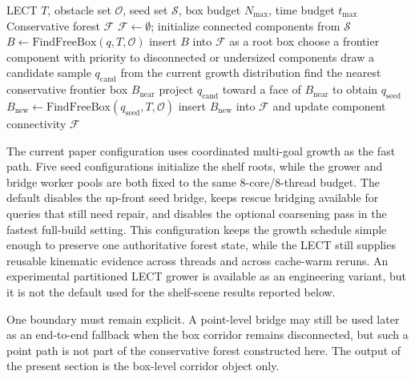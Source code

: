 \documentclass[journal]{IEEEtran}
\DeclareRobustCommand{\textsc}[1]{\textnormal{\MakeUppercase{#1}}}
\newcommand{\calO}{\ensuremath{\mathcal{O}}}
\begin{document}
\begin{algorithm}[t]
\caption{\textsc{GrowForest}---face-adjacent frontier expansion seeded by $\mathcal{S}$}
\label{alg:forest_growth}
\footnotesize
\begin{algorithmic}[1]
\REQUIRE LECT $T$, obstacle set $\calO$, seed set $\mathcal{S}$, box budget $N_{\max}$, time budget $t_{\max}$
\ENSURE Conservative forest $\mathcal{F}$
\STATE $\mathcal{F} \gets \emptyset$; initialize connected components from $\mathcal{S}$
  \STATE $B \gets \text{FindFreeBox}(q, T, \calO)$
    \STATE insert $B$ into $\mathcal{F}$ as a root box
  \ENDIF
\ENDFOR
{}
  \STATE choose a frontier component with priority to disconnected or undersized components
  \STATE draw a candidate sample $q_{\mathrm{cand}}$ from the current growth distribution
  \STATE find the nearest conservative frontier box $B_{\mathrm{near}}$
  \STATE project $q_{\mathrm{cand}}$ toward a face of $B_{\mathrm{near}}$ to obtain $q_{\mathrm{seed}}$
  \STATE $B_{\mathrm{new}} \gets \text{FindFreeBox}(q_{\mathrm{seed}}, T, \calO)$
    \STATE insert $B_{\mathrm{new}}$ into $\mathcal{F}$ and update component connectivity
  \ENDIF
\ENDWHILE
\STATE \RETURN $\mathcal{F}$
\end{algorithmic}
\end{algorithm}

The current paper configuration uses coordinated multi-goal growth as the fast
path. Five seed configurations initialize the shelf roots, while the grower and
bridge worker pools are both fixed to the same 8-core/8-thread budget. The
default disables the up-front seed bridge, keeps rescue bridging available for
queries that still need repair, and disables the optional coarsening pass in the
fastest full-build setting. This configuration keeps the growth schedule simple
enough to preserve one authoritative forest state, while the LECT still supplies
reusable kinematic evidence across threads and across cache-warm reruns. An
experimental partitioned LECT grower is available as an engineering variant, but
it is not the default used for the shelf-scene results reported below.

One boundary must remain explicit. A point-level bridge may still be used later
as an end-to-end fallback when the box corridor remains disconnected,
but such a point path is not part of the conservative forest constructed here. The
output of the present section is the box-level corridor object only.
\end{document}
